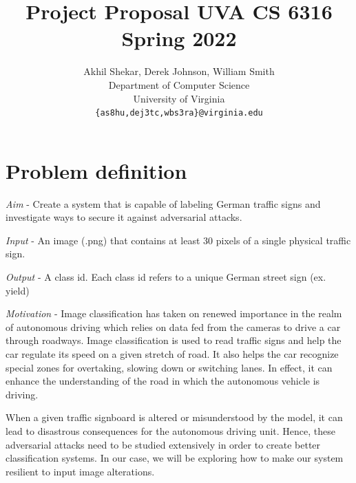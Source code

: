 \documentclass{article} %
\title{Project Proposal UVA CS 6316 \\ Spring 2022}
\author{Akhil Shekar, Derek Johnson, William Smith\\
Department of Computer Science\\
University of Virginia\\
\texttt{\{as8hu,dej3tc,wbs3ra\}@virginia.edu} \\
}
\begin{document}
\maketitle



\section{Problem definition}

\emph{Aim} -  Create a system that is capable of labeling German traffic signs and investigate ways to secure it against adversarial attacks.

\emph{Input} - An image (.png) that contains at least 30 pixels of a single physical traffic sign.

\emph{Output} - A class id. Each class id refers to a unique German street sign (ex. yield)

\emph{Motivation} - 
Image classification has taken on renewed importance in the realm of autonomous driving which relies on data fed from the cameras to drive a car through roadways. Image classification is used to read traffic signs and help the car regulate its speed on a given stretch of road. It also helps the car recognize special zones for overtaking, slowing down or switching lanes. In effect, it can enhance the understanding of the road in which the autonomous vehicle is driving.

When a given traffic signboard is altered or misunderstood by the model, it can lead to disastrous consequences for the autonomous driving unit. Hence, these adversarial attacks need to be studied extensively in order to create better classification systems. In our case, we will be exploring how to make our system resilient to input image alterations.


\end{document}
